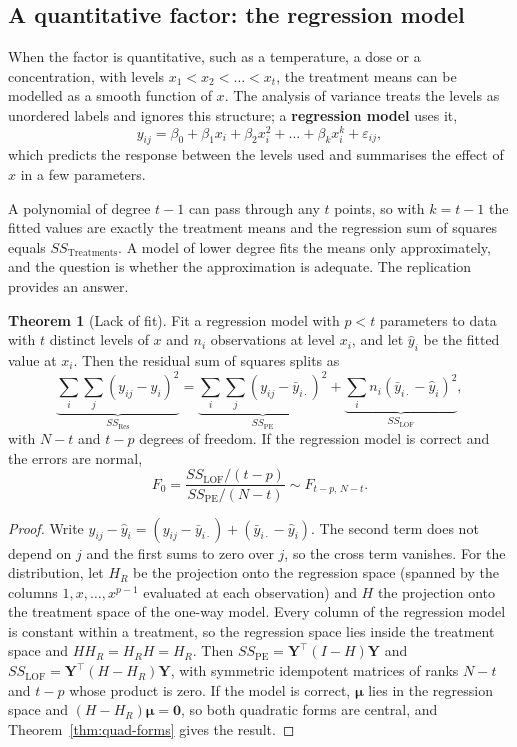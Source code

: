 \documentclass[11pt,a4paper]{article}
\numberwithin{equation}{section}
\theoremstyle{definition}
\newtheorem{thm}{Theorem}[subsection]
\begin{document}
\subsection{A quantitative factor: the regression model}
When the factor is quantitative, such as a temperature, a dose or a concentration, with levels $x_1 < x_2 < \dots < x_t$, the treatment means can be modelled as a
smooth function of $x$. The analysis of variance treats the levels as unordered labels and ignores this structure; a \textbf{regression model} uses it,
\[
y_{ij} = \beta_0 + \beta_1x_i + \beta_2x_i^2 + \dots + \beta_kx_i^k + \varepsilon_{ij} ,
\]
which predicts the response between the levels used and summarises the effect of $x$ in a few parameters.

A polynomial of degree $t - 1$ can pass through any $t$ points, so with $k = t - 1$ the fitted values are exactly the treatment means and the regression
sum of squares equals $SS_{\mathrm{Treatments}}$. A model of lower degree fits the means only approximately, and the question is whether the approximation is
adequate. The replication provides an answer.

\begin{thm}[Lack of fit]\label{thm:lack-of-fit}
Fit a regression model with $p < t$ parameters to data with $t$ distinct levels of $x$ and $n_i$ observations at level $x_i$, and let $\hat y_i$ be the fitted
value at $x_i$. Then the residual sum of squares splits as
\[
\underbrace{\sum_i\sum_j(y_{ij} - \hat y_i)^2}_{SS_{\mathrm{Res}}} = \underbrace{\sum_i\sum_j(y_{ij} - \bar y_{i\cdot})^2}_{SS_{\mathrm{PE}}} + \underbrace{\sum_in_i(\bar y_{i\cdot} - \hat y_i)^2}_{SS_{\mathrm{LOF}}} ,
\]
with $N - t$ and $t - p$ degrees of freedom. If the regression model is correct and the errors are normal,
\[
F_0 = \frac{SS_{\mathrm{LOF}}/(t - p)}{SS_{\mathrm{PE}}/(N - t)} \sim F_{t-p,\,N-t} .
\]
\end{thm}

\begin{proof}
Write $y_{ij} - \hat y_i = (y_{ij} - \bar y_{i\cdot}) + (\bar y_{i\cdot} - \hat y_i)$. The second term does not depend on $j$ and the first sums to zero over $j$, so the cross term
vanishes. For the distribution, let $H_R$ be the projection onto the regression space (spanned by the columns $1, x, \dots, x^{p-1}$ evaluated at each
observation) and $H$ the projection onto the treatment space of the one-way model. Every column of the regression model is constant within a
treatment, so the regression space lies inside the treatment space and $HH_R = H_RH = H_R$. Then $SS_{\mathrm{PE}} = \mathbf Y^\top(I - H)\mathbf Y$ and
$SS_{\mathrm{LOF}} = \mathbf Y^\top(H - H_R)\mathbf Y$, with symmetric idempotent matrices of ranks $N - t$ and $t - p$ whose product is zero. If the model is correct, $\boldsymbol\mu$ lies in the
regression space and $(H - H_R)\boldsymbol\mu = \mathbf 0$, so both quadratic forms are central, and Theorem~\ref{thm:quad-forms} gives the result.
\end{proof}
\end{document}
